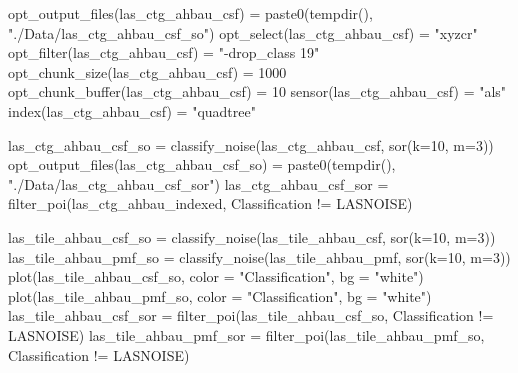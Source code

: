\documentclass[
]{article}
\newenvironment{Shaded}{\begin{snugshade}}{\end{snugshade}}
\newcommand{\AttributeTok}[1]{\textcolor[rgb]{0.77,0.63,0.00}{#1}}
\newcommand{\DecValTok}[1]{\textcolor[rgb]{0.00,0.00,0.81}{#1}}
\newcommand{\FunctionTok}[1]{\textcolor[rgb]{0.00,0.00,0.00}{#1}}
\newcommand{\NormalTok}[1]{#1}
\newcommand{\OtherTok}[1]{\textcolor[rgb]{0.56,0.35,0.01}{#1}}
\newcommand{\SpecialCharTok}[1]{\textcolor[rgb]{0.00,0.00,0.00}{#1}}
\newcommand{\StringTok}[1]{\textcolor[rgb]{0.31,0.60,0.02}{#1}}
\begin{document}
\begin{Shaded}
\begin{Highlighting}[]
\FunctionTok{opt\_output\_files}\NormalTok{(las\_ctg\_ahbau\_csf) }\OtherTok{=} \FunctionTok{paste0}\NormalTok{(}\FunctionTok{tempdir}\NormalTok{(), }\StringTok{"./Data/las\_ctg\_ahbau\_csf\_so"}\NormalTok{)}
\FunctionTok{opt\_select}\NormalTok{(las\_ctg\_ahbau\_csf) }\OtherTok{=} \StringTok{"xyzcr"}
\FunctionTok{opt\_filter}\NormalTok{(las\_ctg\_ahbau\_csf) }\OtherTok{=} \StringTok{"{-}drop\_class 19"}
\FunctionTok{opt\_chunk\_size}\NormalTok{(las\_ctg\_ahbau\_csf) }\OtherTok{=} \DecValTok{1000}
\FunctionTok{opt\_chunk\_buffer}\NormalTok{(las\_ctg\_ahbau\_csf) }\OtherTok{=} \DecValTok{10}
\FunctionTok{sensor}\NormalTok{(las\_ctg\_ahbau\_csf) }\OtherTok{=} \StringTok{"als"}
\FunctionTok{index}\NormalTok{(las\_ctg\_ahbau\_csf) }\OtherTok{=} \StringTok{"quadtree"}

\NormalTok{las\_ctg\_ahbau\_csf\_so }\OtherTok{=} \FunctionTok{classify\_noise}\NormalTok{(las\_ctg\_ahbau\_csf, }\FunctionTok{sor}\NormalTok{(}\AttributeTok{k=}\DecValTok{10}\NormalTok{, }\AttributeTok{m=}\DecValTok{3}\NormalTok{))}
\FunctionTok{opt\_output\_files}\NormalTok{(las\_ctg\_ahbau\_csf\_so) }\OtherTok{=} \FunctionTok{paste0}\NormalTok{(}\FunctionTok{tempdir}\NormalTok{(), }\StringTok{"./Data/las\_ctg\_ahbau\_csf\_sor"}\NormalTok{)}
\NormalTok{las\_ctg\_ahbau\_csf\_sor }\OtherTok{=} \FunctionTok{filter\_poi}\NormalTok{(las\_ctg\_ahbau\_indexed, Classification }\SpecialCharTok{!=}\NormalTok{ LASNOISE)}

\NormalTok{las\_tile\_ahbau\_csf\_so }\OtherTok{=} \FunctionTok{classify\_noise}\NormalTok{(las\_tile\_ahbau\_csf, }\FunctionTok{sor}\NormalTok{(}\AttributeTok{k=}\DecValTok{10}\NormalTok{, }\AttributeTok{m=}\DecValTok{3}\NormalTok{))}
\NormalTok{las\_tile\_ahbau\_pmf\_so }\OtherTok{=} \FunctionTok{classify\_noise}\NormalTok{(las\_tile\_ahbau\_pmf, }\FunctionTok{sor}\NormalTok{(}\AttributeTok{k=}\DecValTok{10}\NormalTok{, }\AttributeTok{m=}\DecValTok{3}\NormalTok{))}
\FunctionTok{plot}\NormalTok{(las\_tile\_ahbau\_csf\_so, }\AttributeTok{color =} \StringTok{"Classification"}\NormalTok{, }\AttributeTok{bg =} \StringTok{"white"}\NormalTok{) }
\FunctionTok{plot}\NormalTok{(las\_tile\_ahbau\_pmf\_so, }\AttributeTok{color =} \StringTok{"Classification"}\NormalTok{, }\AttributeTok{bg =} \StringTok{"white"}\NormalTok{) }
\NormalTok{las\_tile\_ahbau\_csf\_sor }\OtherTok{=} \FunctionTok{filter\_poi}\NormalTok{(las\_tile\_ahbau\_csf\_so, Classification }\SpecialCharTok{!=}\NormalTok{ LASNOISE)}
\NormalTok{las\_tile\_ahbau\_pmf\_sor }\OtherTok{=} \FunctionTok{filter\_poi}\NormalTok{(las\_tile\_ahbau\_pmf\_so, Classification }\SpecialCharTok{!=}\NormalTok{ LASNOISE)}
\end{Highlighting}
\end{Shaded}
\end{document}
